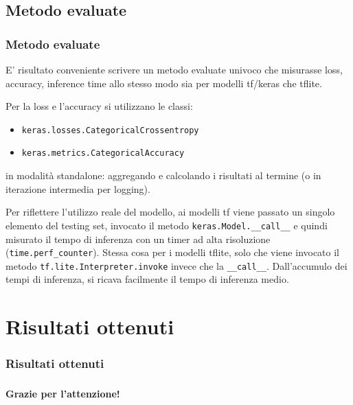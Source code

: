 \documentclass{beamer}
\newcommand{\dflvspace}{\vspace{10pt}}
\begin{document}
\subsection{Metodo evaluate}
\begin{frame}
	\frametitle{Metodo evaluate}
	
	E' risultato conveniente scrivere un metodo evaluate univoco che misurasse loss, accuracy, inference time
	allo stesso modo sia per modelli tf/keras che tflite.
	
	\dflvspace
	
	Per la loss e l'accuracy si utilizzano le classi:
	\begin{itemize}
		\item \texttt{keras.losses.CategoricalCrossentropy}
		\item \texttt{keras.metrics.CategoricalAccuracy}
	\end{itemize}
	in modalità standalone: aggregando e calcolando i risultati al termine (o in iterazione intermedia per logging).
	
	\dflvspace
	
	Per riflettere l'utilizzo reale del modello, ai modelli tf viene passato un singolo elemento del testing set,
	invocato il metodo \texttt{keras.Model.\_\_call\_\_} e quindi misurato il tempo di inferenza con un timer ad alta
	risoluzione (\texttt{time.perf\_counter}). Stessa cosa per i modelli tflite, solo che viene invocato il metodo
	\texttt{tf.lite.Interpreter.invoke} invece che la \texttt{\_\_call\_\_}. Dall'accumulo dei tempi di inferenza,
	si ricava facilmente il tempo di inferenza medio.
\end{frame}

\section{Risultati ottenuti}
\begin{frame}
    \frametitle{Risultati ottenuti}
    

\end{frame}

\begin{frame}
    \frametitle{}
    
    \fontsize{30pt}{10pt}\selectfont
    \centering
    \textbf{Grazie per l'attenzione!}
    
\end{frame}
\end{document}
